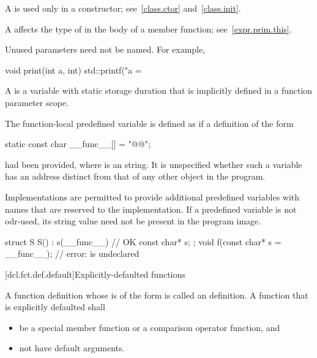 \pnum
{}%
%
%
A
is used only in a constructor; see~\ref{class.ctor} and~\ref{class.init}.

\pnum
\begin{note}
A  affects the type of 
in the body of a member function; see~\ref{expr.prim.this}.
\end{note}

\pnum
\begin{note}
Unused parameters need not be named.
For example,

\begin{codeblock}
void print(int a, int) {
  std::printf("a = %
}
\end{codeblock}
\end{note}

\pnum
A  is a variable with static
storage duration that is implicitly defined in a function parameter scope.

\pnum
{}%
The function-local predefined variable  is
defined as if a definition of the form
\begin{codeblock}
static const char __func__[] = "@@";
\end{codeblock}
had been provided, where  is an  string.
It is unspecified whether such a variable has an address
distinct from that of any other object in the program.
\begin{footnote}
Implementations are
permitted to provide additional predefined variables with names that are reserved to the
implementation. If a predefined variable is not
odr-used, its string value need not be present in the program image.
\end{footnote}
\begin{example}
\begin{codeblock}
struct S {
  S() : s(__func__) { }             // OK
  const char* s;
};
void f(const char* s = __func__);   // error:  is undeclared
\end{codeblock}
\end{example}

[dcl.fct.def.default]{Explicitly-defaulted functions}%

\pnum
A function definition whose
is of the form
is called an  definition.
A function that is explicitly defaulted shall
\begin{itemize}
\item be a special member function or
a comparison operator function, and
\item not have default arguments.
\end{itemize}

